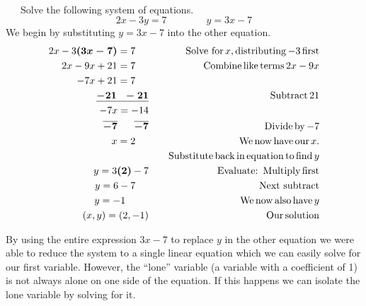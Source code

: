 \vspace{1in}
~\\
\begin{example}~~~Solve the following system of equations.
$$2 x - 3 y = 7\qquad\qquad y = 3 x - 7$$
We begin by substituting $y=3x-7$ into the other equation.
  \begin{eqnarray*}
    2 x - 3 \tmmathbf{(3 x - 7)} = 7~~~~ &  & \tmop{Solve~for} x, %
		\tmop{distributing} - 3 \tmop{first}\\
    2 x - 9 x + 21 = 7~~~~ &  & \tmop{Combine} \tmop{like} \tmop{terms} 2 x - 9x\\
    - 7 x + 21 = 7~~~~ &  &\\
    \underline{\tmmathbf{- 21 ~~- 21}} &  & \tmop{Subtract} 21 \\
    - 7 x = - 14 &  &\\
    \tmmathbf{\overline{- 7} ~~~~~ \overline{- 7}} &  & \tmop{Divide} \tmop{by} - 7 \\
    x = 2~~~~ &  & \tmop{We} \tmop{now} \tmop{have} \tmop{our} x.\\
		& & \tmop{~~~Substitute} \tmop{back} \tmop{in} \tmop{equation} \tmop{to} \tmop{find} y\\
    y = 3 \tmmathbf{(2)} - 7 &  & \tmop{Evaluate:} \tmop{~Multiply} \tmop{first}\\
    y = 6 - 7~~~~ &  & \tmop{Next~subtract}\\
    y = - 1~~~~~~~ &  & \tmop{We} \tmop{now} \tmop{also} \tmop{have} y\\
    (x,y)=(2, - 1) &  & \tmop{Our} \tmop{solution}
  \end{eqnarray*}
\end{example}
By using the entire expression $3 x - 7$ to replace $y$ in the other equation
we were able to reduce the system to a single linear equation which we can
easily solve for our first variable. However, the ``lone'' variable (a variable
with a coefficient of 1) is not always alone on one side of the equation. If
this happens we can isolate the lone variable by solving for it.

